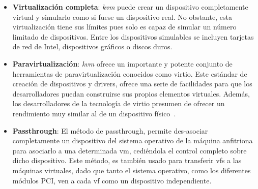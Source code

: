 \begin{itemize}
\item \textbf{Virtualización completa}: \textit{\gls{kvm}} puede crear un dispositivo completamente virtual y simularlo como si fuese un dispositivo real. No obstante, esta virtualización tiene sus límites pues solo es capaz de simular un número limitado de dispositivos. Entre los dispositivos simulables se incluyen tarjetas de red de Intel, dispositivos gráficos o discos duros.
\item \textbf{Paravirtualización}: \textit{\gls{kvm}} ofrece un importante y potente conjunto de herramientas de paravirtualización conocidos como \gls{virtio}. Este estándar de creación de dispositivos y drivers, ofrece una serie de facilidades para que los desarrolladores puedan construirse sus propios elementos virtuales. Además, los desarrolladores de la tecnología de \gls{virtio} presumen de ofrecer un rendimiento muy similar al de un dispositivo físico~\cite{russell2008virtio}.
\item \textbf{Passthrough}: El método de passthrough, permite des-asociar completamente un dispositivo del sistema operativo de la máquina anfitriona para asociarlo a una determinada \gls{vm}, cediéndola el control completo sobre dicho dispositivo. Este método, es también usado para transferir \glspl{vf} a las máquinas virtuales, dado que tanto el sistema operativo, como los diferentes módulos PCI, ven a cada \gls{vf} como un dispositivo independiente.
\end{itemize}

